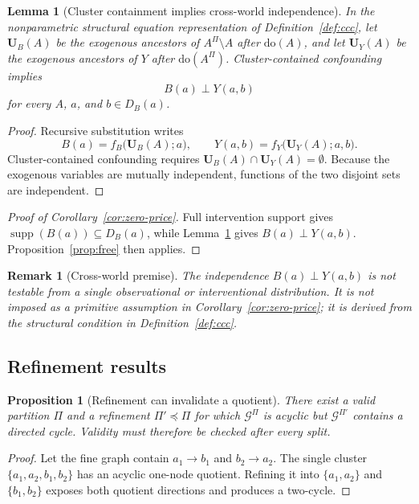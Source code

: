 \documentclass[twoside]{article}
\newtheorem{proposition}{Proposition}
\newtheorem{lemma}{Lemma}
\newtheorem{remark}{Remark}
\newcommand{\doo}{\mathrm{do}}
\newcommand{\Gg}{\mathcal{G}}
\begin{document}
\begin{lemma}[Cluster containment implies cross-world independence]
\label{lem:ccc}
In the nonparametric structural equation representation of Definition~\ref{def:ccc}, let \(\mathbf U_B(A)\) be the exogenous ancestors of \(A^\Pi\setminus A\) after \(\doo(A)\), and let \(\mathbf U_Y(A)\) be the exogenous ancestors of \(Y\) after \(\doo(A^\Pi)\). Cluster-contained confounding implies
\[
 B(a)\perp Y(a,b)
\]
for every \(A\), \(a\), and \(b\in D_B(a)\).
\end{lemma}

\begin{proof}
Recursive substitution writes
\[
 B(a)=f_B\bigl(\mathbf U_B(A);a\bigr),
 \qquad
 Y(a,b)=f_Y\bigl(\mathbf U_Y(A);a,b\bigr).
\]
Cluster-contained confounding requires \(\mathbf U_B(A)\cap\mathbf U_Y(A)=\emptyset\). Because the exogenous variables are mutually independent, functions of the two disjoint sets are independent.
\end{proof}

\begin{proof}[Proof of Corollary~\ref{cor:zero-price}]
Full intervention support gives \(\operatorname{supp}(B(a))\subseteq D_B(a)\), while Lemma~\ref{lem:ccc} gives \(B(a)\perp Y(a,b)\). Proposition~\ref{prop:free} then applies.
\end{proof}

\begin{remark}[Cross-world premise]
The independence \(B(a)\perp Y(a,b)\) is not testable from a single observational or interventional distribution. It is not imposed as a primitive assumption in Corollary~\ref{cor:zero-price}; it is derived from the structural condition in Definition~\ref{def:ccc}.
\end{remark}

\subsection{Refinement results}

\begin{proposition}[Refinement can invalidate a quotient]
\label{prop:refinement-validity}
There exist a valid partition \(\Pi\) and a refinement \(\Pi'\preceq\Pi\) for which \(\Gg^\Pi\) is acyclic but \(\Gg^{\Pi'}\) contains a directed cycle. Validity must therefore be checked after every split.
\end{proposition}

\begin{proof}
Let the fine graph contain \(a_1\to b_1\) and \(b_2\to a_2\). The single cluster \(\{a_1,a_2,b_1,b_2\}\) has an acyclic one-node quotient. Refining it into \(\{a_1,a_2\}\) and \(\{b_1,b_2\}\) exposes both quotient directions and produces a two-cycle.
\end{proof}
\end{document}
